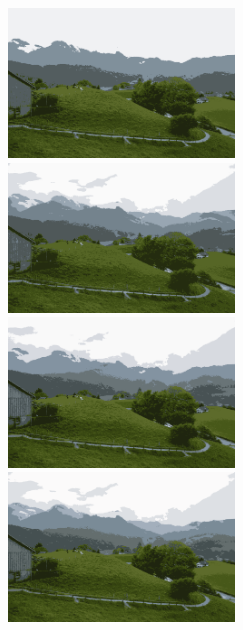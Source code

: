 \begin{center}
\begin{figure}[H]
\centering\includegraphics[width=6cm]{./imgkmeanscluster02-07.png}\\
\centering\includegraphics[width=6cm]{./imgkmeanscluster02-08.png}
\centering\includegraphics[width=6cm]{./imgkmeanscluster02-09.png}\\
\centering\includegraphics[width=6cm]{./imgkmeanscluster02-10.png}
\end{figure}
\end{center}

